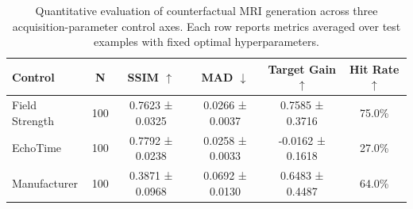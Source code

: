 \begin{table}[t]
\centering
\caption{Quantitative evaluation of counterfactual MRI generation across three acquisition-parameter control axes. Each row reports metrics averaged over test examples with fixed optimal hyperparameters.}
\label{tab:main_results}
\small
\begin{tabular}{lccccc}
\toprule
Control & N & SSIM $\uparrow$ & MAD $\downarrow$ & Target Gain $\uparrow$ & Hit Rate $\uparrow$ \\
\midrule
Field Strength & 100 & 0.7623 ± 0.0325 & 0.0266 ± 0.0037 & 0.7585 ± 0.3716 & 75.0\% \\
EchoTime & 100 & 0.7792 ± 0.0238 & 0.0258 ± 0.0033 & -0.0162 ± 0.1618 & 27.0\% \\
Manufacturer & 100 & 0.3871 ± 0.0968 & 0.0692 ± 0.0130 & 0.6483 ± 0.4487 & 64.0\% \\
\bottomrule
\end{tabular}
\end{table}